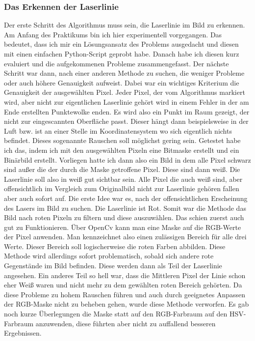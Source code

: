 	\label{chap:bildverarbeitung}
		\subsubsection{Das Erkennen der Laserlinie}
		Der erste Schritt des Algorithmus muss sein, die Laserlinie im Bild zu erkennen. Am Anfang des Praktikums bin ich hier experimentell vorgegangen. Das bedeutet, dass ich mir ein Lösungsansatz des Problems ausgedacht und diesen mit einen einfachen Python-Script geprobt habe. Danach habe ich diesen kurz evaluiert und die aufgekommenen Probleme zusammengefasst. Der nächste Schritt war dann, nach einer anderen Methode zu suchen, die weniger Probleme oder auch höhere Genauigkeit aufweist. Dabei war ein wichtiges Kriterium die Genauigkeit der ausgewählten Pixel. Jeder Pixel, der vom Algorithmus markiert wird, aber nicht zur eigentlichen Laserlinie gehört wird in einem Fehler in der am Ende erstellten Punktewolke enden. Es wird also ein Punkt im Raum gezeigt, der nicht zur eingescannten Oberfläche passt. Dieser hängt dann beispielsweise in der Luft bzw. ist an einer Stelle im Koordinatensystem wo sich eigentlich nichts befindet. Dieses sogenannte Rauschen soll möglichst gering sein. Getestet habe ich das, indem ich mit den ausgewählten Pixeln eine Bitmaske erstellt und ein Binärbild erstellt. Vorliegen hatte ich dann also ein Bild in dem alle Pixel schwarz sind außer die der durch die Maske getroffene Pixel. Diese sind dann weiß. Die Laserlinie soll also in weiß gut sichtbar sein. Alle Pixel die auch weiß sind, aber offensichtlich im Vergleich zum Originalbild nicht zur Laserlinie gehören fallen aber auch sofort auf.\newline
		Die erste Idee war es, nach der offensichtlichen Erscheinung des Lasers im Bild zu suchen. Die Laserlinie ist Rot. Somit war die Methode das Bild nach roten Pixeln zu filtern und diese auszuwählen. Das schien zuerst auch gut zu Funktionieren. Über OpenCv kann man eine Maske auf die RGB-Werte der Pixel anwenden. Man kennzeichnet also einen zulässigen Bereich für alle drei Werte. Dieser Bereich soll logischerweise die roten Farben abbilden. Diese Methode wird allerdings sofort problematisch, sobald sich andere rote Gegenstände im Bild befinden. Diese werden dann als Teil der Laserlinie angesehen. Ein anderes Teil so hell war, dass die Mittleren Pixel der Linie schon eher Weiß waren und nicht mehr zu dem gewählten roten Bereich gehörten. Da diese Probleme zu hohem Rauschen führen und auch durch geeignetes Anpassen der RGB-Maske nicht zu beheben gehen, wurde diese Methode verworfen. Es gab noch kurze Überlegungen die Maske statt auf den RGB-Farbraum auf den HSV-Farbraum anzuwenden, diese führten aber nicht zu auffallend besseren Ergebnissen. \newline

